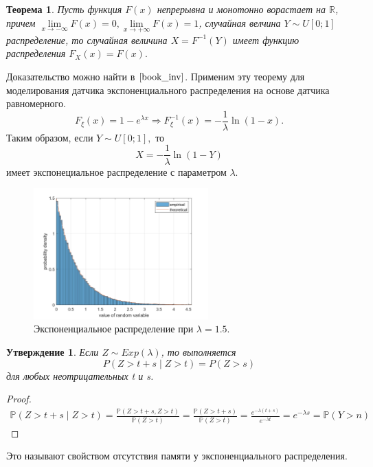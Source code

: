 \documentclass[oneside, final, 12pt]{article}
\def\P{{\mathbb{P} }}
\newtheorem{theorem}{Теорема}
\newtheorem{statement}{Утверждение}
\begin{document}
	\begin{theorem}
	 	Пусть функция $F(x)$ непрерывна и монотонно ворастает на $\mathbb{R}$, причем
		\newline $\lim\limits_{x\rightarrow - \infty}F(x) = 0, \lim\limits_{x\rightarrow + \infty}F(x) = 1$, 
		случайная велчина $Y\sim U[0;1]$ распределение, то случайная величина $X=F^{-1}(Y)$ имеет 
		функцию распределения $F_X(x) = F(x).$
	\end{theorem}
	Доказательство можно найти в $\cite{book_inv}$.
	\newline
	Применим эту теорему для моделирования датчика экспоненциального распределения на основе 
	датчика равномерного.
	$$
			F_{\xi}(x) = 1 -e^{\lambda x} \Rightarrow F^{-1}_{\xi}(x) = -\frac{1}{\lambda}\ln(1-x).
	$$ 
	Таким образом, если $Y\sim U[0;1],$ то
	$$
		X = -\frac{1}{\lambda}\ln(1-Y)
	$$
	имеет экспонециальное распределение с параметром $\lambda$.
	\begin{figure}[h!]
		\centering
		\includegraphics[width=0.6\textwidth]{../code/Task_3/pict/exp_vis_ex.png}
		\caption{Экспоненциальное распределение при $\lambda = 1.5$. }
    \end{figure}

    \begin{statement}
    Если $Z \sim Exp(\lambda)$, то выполняется 
            $$P(Z > t + s \mid Z > t) = P(Z > s)$$ для любых неотрицательных t и s. 
    \end{statement}

    \begin{proof}
        \begin{multline}
          \P(Z > t + s \mid Z > t) = \frac{\P(Z > t + s, Z > t)}{\P(Z > t)} = \frac{\P(Z > t+s)}{\P(Z > t)} 
					 = \frac{e^{-\lambda (t+s)}}{e^{-\lambda t}} = e^{-\lambda s} =\P(Y > n)
        \end{multline}
    \end{proof}
    Это называют свойством отсутствия памяти у экспоненциального распределения.
	
\end{document}
